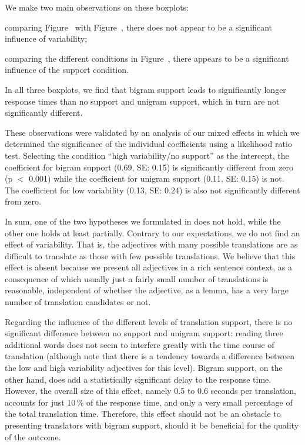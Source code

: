\documentclass[output=paper]{LSP/langsci}
\begin{document}
We make two main observations on these boxplots: 
\begin{inparaenum}[(a)]
\item comparing Figure~ with
  Figure~, there does not appear to be a
  significant influence of variability;
\item comparing the different conditions in
  Figure~, there appears to be a significant
  influence of the support condition.
\end{inparaenum}
In all three boxplots, we find that bigram support leads to
significantly longer response times than no support and unigram
support, which in turn are not significantly different. 

These observations were validated by an analysis of our mixed effects
in which we determined the significance of the individual coefficients
using a likelihood ratio test. Selecting the condition ``high
variability/no support'' as the intercept, the coefficient for bigram
support (0.69, SE: 0.15) is significantly different from zero
(p $<$ 0.001) while the coefficient for unigram support (0.11, SE: 0.15)
is not. The coefficient for low variability (0.13, SE: 0.24) is also
not significantly different from zero.



In sum, one of the two hypotheses we formulated in
 does not hold, while the other one holds at
least partially. Contrary to our expectations, we do not find an
effect of variability. That is, the adjectives with many possible
translations are as difficult to translate as those with few possible
translations. We believe that this effect is absent because we present
all adjectives in a rich sentence context, as a consequence of which
usually just a fairly small number of translations is reasonable,
independent of whether the adjective, as a lemma, has a very large
number of translation candidates or not. 

Regarding the influence of the different levels of translation
support, there is no significant difference between no support and
unigram support: reading three additional words does not seem to
interfere greatly with the time course of translation (although note
that there is a tendency towards a difference between the low and high
variability adjectives for this level). Bigram support, on the other
hand, does add a statistically significant delay to the response
time. However, the overall size of this effect, namely 0.5 to 0.6
seconds per translation, accounts for just 10\,\% of the response time,
and only a very small percentage of the total translation
time. Therefore, this effect should not be an obstacle to presenting
translators with bigram support, should it be beneficial for the
quality of the outcome.
\end{document}
